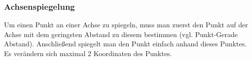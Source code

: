 \subsubsection{Achsenspiegelung}
Um einen Punkt an einer Achse zu spiegeln, muss man zuerst den Punkt auf der
Achse mit dem geringsten Abstand zu diesem bestimmen (vgl. Punkt-Gerade Abstand).
Anschließend spiegelt man den Punkt einfach anhand dieses Punktes.
Es verändern sich maximal 2 Koordinaten des Punktes.
